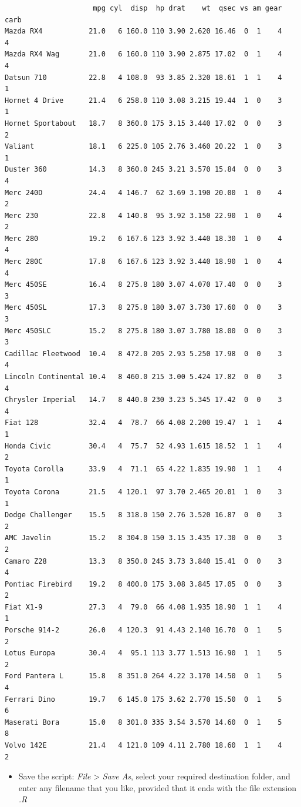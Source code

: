 \documentclass[
  letterpaper,
  DIV=11,
  numbers=noendperiod,
  oneside]{scrreprt}
\providecommand{\tightlist}{%
  \setlength{\itemsep}{0pt}\setlength{\parskip}{0pt}}\usepackage{longtable,booktabs,array}
\begin{document}
\begin{verbatim}
                     mpg cyl  disp  hp drat    wt  qsec vs am gear carb
Mazda RX4           21.0   6 160.0 110 3.90 2.620 16.46  0  1    4    4
Mazda RX4 Wag       21.0   6 160.0 110 3.90 2.875 17.02  0  1    4    4
Datsun 710          22.8   4 108.0  93 3.85 2.320 18.61  1  1    4    1
Hornet 4 Drive      21.4   6 258.0 110 3.08 3.215 19.44  1  0    3    1
Hornet Sportabout   18.7   8 360.0 175 3.15 3.440 17.02  0  0    3    2
Valiant             18.1   6 225.0 105 2.76 3.460 20.22  1  0    3    1
Duster 360          14.3   8 360.0 245 3.21 3.570 15.84  0  0    3    4
Merc 240D           24.4   4 146.7  62 3.69 3.190 20.00  1  0    4    2
Merc 230            22.8   4 140.8  95 3.92 3.150 22.90  1  0    4    2
Merc 280            19.2   6 167.6 123 3.92 3.440 18.30  1  0    4    4
Merc 280C           17.8   6 167.6 123 3.92 3.440 18.90  1  0    4    4
Merc 450SE          16.4   8 275.8 180 3.07 4.070 17.40  0  0    3    3
Merc 450SL          17.3   8 275.8 180 3.07 3.730 17.60  0  0    3    3
Merc 450SLC         15.2   8 275.8 180 3.07 3.780 18.00  0  0    3    3
Cadillac Fleetwood  10.4   8 472.0 205 2.93 5.250 17.98  0  0    3    4
Lincoln Continental 10.4   8 460.0 215 3.00 5.424 17.82  0  0    3    4
Chrysler Imperial   14.7   8 440.0 230 3.23 5.345 17.42  0  0    3    4
Fiat 128            32.4   4  78.7  66 4.08 2.200 19.47  1  1    4    1
Honda Civic         30.4   4  75.7  52 4.93 1.615 18.52  1  1    4    2
Toyota Corolla      33.9   4  71.1  65 4.22 1.835 19.90  1  1    4    1
Toyota Corona       21.5   4 120.1  97 3.70 2.465 20.01  1  0    3    1
Dodge Challenger    15.5   8 318.0 150 2.76 3.520 16.87  0  0    3    2
AMC Javelin         15.2   8 304.0 150 3.15 3.435 17.30  0  0    3    2
Camaro Z28          13.3   8 350.0 245 3.73 3.840 15.41  0  0    3    4
Pontiac Firebird    19.2   8 400.0 175 3.08 3.845 17.05  0  0    3    2
Fiat X1-9           27.3   4  79.0  66 4.08 1.935 18.90  1  1    4    1
Porsche 914-2       26.0   4 120.3  91 4.43 2.140 16.70  0  1    5    2
Lotus Europa        30.4   4  95.1 113 3.77 1.513 16.90  1  1    5    2
Ford Pantera L      15.8   8 351.0 264 4.22 3.170 14.50  0  1    5    4
Ferrari Dino        19.7   6 145.0 175 3.62 2.770 15.50  0  1    5    6
Maserati Bora       15.0   8 301.0 335 3.54 3.570 14.60  0  1    5    8
Volvo 142E          21.4   4 121.0 109 4.11 2.780 18.60  1  1    4    2
\end{verbatim}

\begin{itemize}
\tightlist
\item
  Save the script: \emph{File} \textgreater{} \emph{Save As}, select
  your required destination folder, and enter any filename that you
  like, provided that it ends with the file extension \emph{.R}
\end{itemize}
\end{document}
